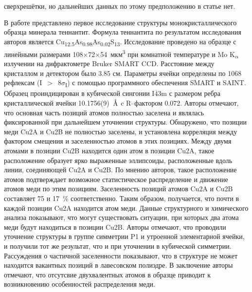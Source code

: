 сверхрешётки, но дальнейших данных по этому предположению в статье нет.


В работе \cite{Makovicky2005} представлено первое исследование структуры монокристаллического образца минерала теннантит. Формула теннантита по результатом исследования авторов является Cu\textsubscript{12.5}As\textsubscript{0.98}As\textsubscript{0.02}S\textsubscript{13}. Исследование проведено на образце с линейными размерами 108$\times$72$\times$54~мкм\textsuperscript{3} при комнатной температуре и Mo K\textsubscript{$\alpha$} излучении на дифрактометре Bruker SMART CCD. Расстояние между кристаллом и детектором было 3.85 см. Параметры ячейки определены по 1068 рефлексам (I~$>$~8$\sigma$\textsubscript{I}) с помощью программного обеспечения SMART и SAINT. Образец проиндицирован в кубической сингонии I$\overline{\!4}$3m с размером ребра кристаллической ячейки 10.1756(9)~$\mbox{\normalfont\AA}$ c R--фактором 0.072. Авторы отмечают, что основная часть позиций атомов полностью заселена и являлась фиксированной при дальнейшем уточнении структуры. Обнаружено, что позиции меди Cu2A и Cu2B не полностью заселены, и установлена корреляция между фактором смещения и заселенностью атомов в этих позициях. Между двумя атомами в позиции Cu2B находится один атом в позиции Cu2A, такое расположение образует ярко выраженные эллипсоиды, расположенные вдоль линии, соединяющей Cu2A и Cu2B.  По мнению авторов, такое расположение атомов подтверждает возможное статистическое распределение и движение атомов меди  по этим позициям. Заселенность позиций атомов Cu2A и Cu2B составляет 75 и 17~\% соответственно. Таким образом, получается, что почти в каждой позиции Cu2A находится атом меди. Данные структурного и химического анализа показывают, что могут существовать ситуации, при которых два атома меди будут находиться в позиции  Cu2B. Авторы отмечают, что проводили уточнение структуры в группе симметрии P1 и утроенной элементарной ячейки, и получили тот же результат, что и при уточнении в кубической симметрии. Рассуждения о частичной заселенности показывают, что в структуре не может находится вакантных позиций в лавесовском полиэдре. В заключение авторы отмечают, что отсутсвие двухвалентных атомов в образце приводит к возникновению особенностей распределения меди.



